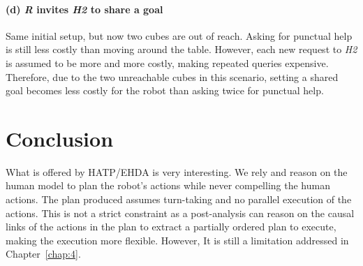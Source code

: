 \paragraph{(d) \textit{R} invites \textit{H2} to share a goal}
Same initial setup, but now two cubes are out of reach. Asking for punctual help is still less costly than moving around the table. 
However, each new request to \textit{H2} is assumed to be more and more costly, making repeated queries expensive.  
Therefore, due to the two unreachable cubes in this scenario, setting a shared goal becomes less costly for the robot than asking twice for punctual help.

\section{Conclusion}

What is offered by HATP/EHDA is very interesting. We rely and reason on the human model to plan the robot's actions while never compelling the human actions. The plan produced assumes turn-taking and no parallel execution of the actions. This is not a strict constraint as a post-analysis can reason on the causal links of the actions in the plan to extract a partially ordered plan to execute, making the execution more flexible. However, It is still a limitation addressed in Chapter~\ref{chap:4}.